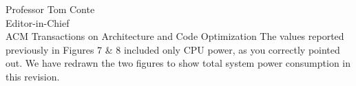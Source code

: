 \documentclass[10pt]{letter} %
\begin{document}
\begin{letter}{Professor Tom Conte \\
Editor-in-Chief \\
ACM Transactions on Architecture and Code Optimization }
The values reported previously in Figures 7 \& 8 included only CPU
power, as you correctly pointed out. We have redrawn the two figures to
show total system power consumption in this revision.
\clearpage



\end{letter}
\end{document}
